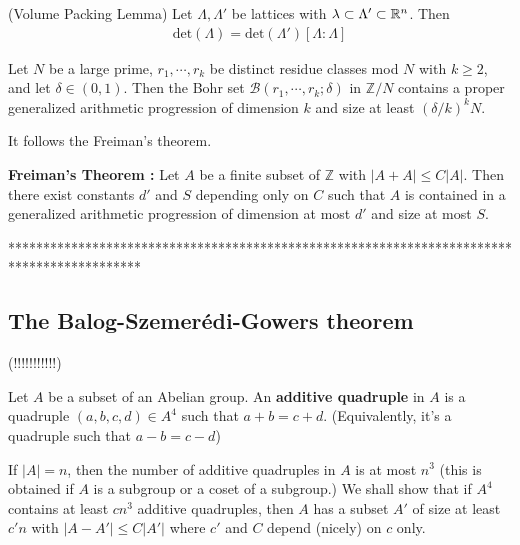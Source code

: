 \documentclass[10pt,a4paper]{report}
\begin{document}
\lem (Volume Packing Lemma) Let $\Lambda, \Lambda'$ be lattices with $\lambda \subset \Lambda' \subset \mathbb{R}^n$. Then
\begin{align*}
\text{det}(\Lambda) = \text{det}(\Lambda')[\Lambda : \Lambda]
\end{align*}
\s

\prop Let $N$ be a large prime, $r_1, \cdots, r_k$ be distinct residue classes mod $N$ with $k\geq 2$, and let $\delta\in (0,1)$. Then the Bohr set $\mathscr{B}(r_1, \cdots, r_k ;\delta)$ in $\mathbb{Z}/N$ contains a proper generalized arithmetic progression of dimension $k$ and size at least $(\delta/k)^k N$.
\s

It follows the Freiman's theorem.
\s

\textbf{Freiman's Theorem :} Let $A$ be a finite subset of $\mathbb{Z}$ with $|A+A|\leq C|A|$. Then there exist constants $d'$ and $S$ depending only on $C$ such that $A$ is contained in a generalized arithmetic progression of dimension at most $d'$ and size at most $S$.
\s

*******************************************************************************************
\s

\subsection*{The Balog-Szemer\'{e}di-Gowers theorem}
(!!!!!!!!!!!)

 Let $A$ be a subset of an Abelian group. An \textbf{additive quadruple} in $A$ is a quadruple $(a,b,c,d) \in A^4$ such that $a+b = c+d$. (Equivalently, it's a quadruple such that $a-b= c-d$)
\s

If $|A|=n$, then the number of additive quadruples in $A$ is at most $n^3$ (this is obtained if $A$ is a subgroup or a coset of a subgroup.) We shall show that if $A^4$ contains at least $cn^3$ additive quadruples, then $A$ has a subset $A'$ of size at least $c'n$ with $|A-A'| \leq C|A'|$ where $c'$ and $C$ depend (nicely) on $c$ only.
\end{document}
